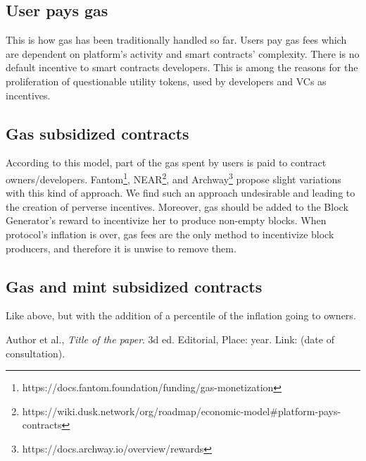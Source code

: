 \documentclass[twocolumn, nofootinbib]{revtex4-2} %
\begin{document}
    \subsection{User pays gas}\label{sec:innovative-cost-management-approach:user-pays-gas}
    This is how gas has been traditionally handled so far.
    Users pay gas fees which are dependent on platform's activity and smart
    contracts' complexity.
    There is no default incentive to smart contracts developers.
    This is among the reasons for the proliferation of questionable utility
    tokens, used by developers and VCs as incentives.

    \subsection{Gas subsidized contracts}\label{sec:innovative-cost-management-approach:gas-subsidized-contracts}
    According to this model, part of the gas spent by users is paid to contract
    owners/developers.
    Fantom\footnote{https://docs.fantom.foundation/funding/gas-monetization},
    NEAR\footnote{https://wiki.dusk.network/org/roadmap/economic-model\#platform-pays-contracts},
    and Archway\footnote{https://docs.archway.io/overview/rewards} propose slight
    variations with this kind of approach.
    We find such an approach undesirable and leading to the creation of perverse
    incentives.
    Moreover, gas should be added to the Block Generator's reward to
    incentivize her to produce non-empty blocks.
    When protocol's inflation is over, gas fees are the only method to
    incentivize block producers, and therefore it is unwise to remove them.

    \subsection{Gas and mint subsidized contracts}\label{sec:innovative-cost-management-approach:gas-and-mint-subsidized-contracts}
    Like above, but with the addition of a percentile of the inflation going to
    owners.
    
    \begin{thebibliography}{99}
    	 Author et al., {\it Title of the paper}. 3d ed. Editorial, Place: year. Link: (date of consultation). 
   	\end{thebibliography}
\end{document}
